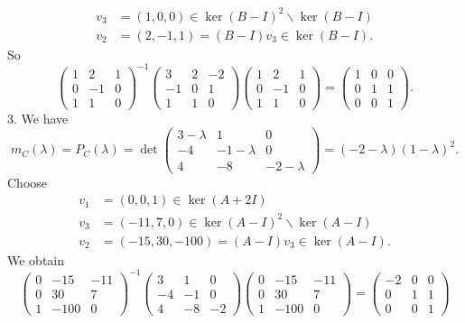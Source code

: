 ﻿\documentclass[12pt]{article}
\begin{document}
\begin{sol}
\begin{align*}
        v_3 &= (1,0,0) \in \ker(B - I)^2 \backslash \ker(B - I)\\
        v_2 &= (2,-1,1) = (B - I)v_3 \in \ker(B - I).
    \end{align*}
    So 
    \[
        \begin{pmatrix}
            1 & 2 & 1\\
            0 & -1 & 0\\
            1 & 1 & 0 
        \end{pmatrix}^{-1}\begin{pmatrix}
            3 & 2 & -2\\
            -1 & 0 & 1\\
            1 & 1 & 0
        \end{pmatrix}
        \begin{pmatrix}
            1 & 2 & 1\\
            0 & -1 & 0\\
            1 & 1 & 0 
        \end{pmatrix}
        =\begin{pmatrix}
            1 & 0 & 0\\
            0 & 1 & 1\\
            0 & 0 & 1
        \end{pmatrix}.
    \]
    3. We have 
    \[
        m_C(\lambda) = P_C(\lambda) = \det\begin{pmatrix}
            3 - \lambda & 1 & 0\\
            -4 & -1 - \lambda & 0\\
            4 & -8 & -2 -\lambda 
        \end{pmatrix} = (-2 -\lambda)(1 - \lambda)^2.
    \]
    Choose 
    \begin{align*}
        v_1 &= (0,0,1) \in \ker(A + 2I)\\
        v_3 &= (-11,7,0) \in \ker(A - I)^2 \backslash \ker(A - I) \\
        v_2 &= (-15,30,-100) = (A - I)v_3 \in \ker(A - I) .
    \end{align*}
    We obtain 
    \[
        \begin{pmatrix}
            0 & -15 & -11\\
            0 & 30 & 7\\
            1 & -100 & 0
        \end{pmatrix}^{-1}
        \begin{pmatrix}
            3 & 1 & 0\\
            -4 & -1 & 0\\
            4 & -8 & -2
        \end{pmatrix}
        \begin{pmatrix}
            0 & -15 & -11\\
            0 & 30 & 7\\
            1 & -100 & 0
        \end{pmatrix} =\begin{pmatrix}
            -2 & 0 & 0\\
            0 & 1 & 1\\
            0 & 0 & 1
        \end{pmatrix}
    \]
\end{sol}
\end{document}
